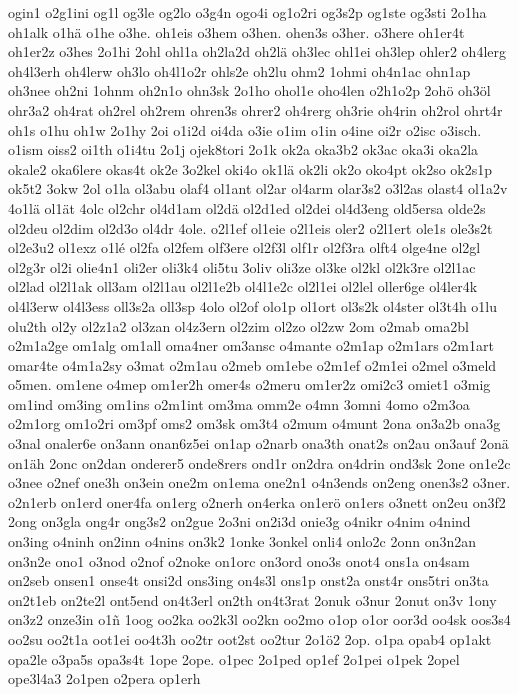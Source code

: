 {ogin1
o2g1ini
og1l
og3le
og2lo
o3g4n
ogo4i
og1o2ri
og3s2p
og1ste
og3sti
2o1ha
oh1alk
o1hä
o1he
o3he.
oh1eis
o3hem
o3hen.
ohen3s
o3her.
o3here
oh1er4t
oh1er2z
o3hes
2o1hi
2ohl
ohl1a
oh2la2d
oh2lä
oh3lec
ohl1ei
oh3lep
ohler2
oh4lerg
oh4l3erh
oh4lerw
oh3lo
oh4l1o2r
ohls2e
oh2lu
ohm2
1ohmi
oh4n1ac
ohn1ap
oh3nee
oh2ni
1ohnm
oh2n1o
ohn3sk
2o1ho
ohol1e
oho4len
o2h1o2p
2ohö
oh3öl
ohr3a2
oh4rat
oh2rel
oh2rem
ohren3s
ohrer2
oh4rerg
oh3rie
oh4rin
oh2rol
ohrt4r
oh1s
o1hu
oh1w
2o1hy
2oi
o1i2d
oi4da
o3ie
o1im
o1in
o4ine
oi2r
o2isc
o3isch.
o1ism
oiss2
oi1th
o1i4tu
2o1j
ojek8tori
2o1k
ok2a
oka3b2
ok3ac
oka3i
oka2la
okale2
oka6lere
okas4t
ok2e
3o2kel
oki4o
ok1lä
ok2li
ok2o
oko4pt
ok2so
ok2s1p
ok5t2
3okw
2ol
o1la
ol3abu
olaf4
ol1ant
ol2ar
ol4arm
olar3s2
o3l2as
olast4
ol1a2v
4o1lä
ol1ät
4olc
ol2chr
ol4d1am
ol2dä
ol2d1ed
ol2dei
ol4d3eng
old5ersa
olde2s
ol2deu
ol2dim
ol2d3o
ol4dr
4ole.
o2l1ef
ol1eie
o2l1eis
oler2
o2l1ert
ole1s
ole3s2t
ol2e3u2
ol1exz
o1lé
ol2fa
ol2fem
olf3ere
ol2f3l
olf1r
ol2f3ra
olft4
olge4ne
ol2gl
ol2g3r
ol2i
olie4n1
oli2er
oli3k4
oli5tu
3oliv
oli3ze
ol3ke
ol2kl
ol2k3re
ol2l1ac
ol2lad
ol2l1ak
oll3am
ol2l1au
ol2l1e2b
ol4l1e2c
ol2l1ei
ol2lel
oller6ge
ol4ler4k
ol4l3erw
ol4l3ess
oll3s2a
oll3sp
4olo
ol2of
olo1p
ol1ort
ol3s2k
ol4ster
ol3t4h
o1lu
olu2th
ol2y
ol2z1a2
ol3zan
ol4z3ern
ol2zim
ol2zo
ol2zw
2om
o2mab
oma2bl
o2m1a2ge
om1alg
om1all
oma4ner
om3ansc
o4mante
o2m1ap
o2m1ars
o2m1art
omar4te
o4m1a2sy
o3mat
o2m1au
o2meb
om1ebe
o2m1ef
o2m1ei
o2mel
o3meld
o5men.
om1ene
o4mep
om1er2h
omer4s
o2meru
om1er2z
omi2c3
omiet1
o3mig
om1ind
om3ing
om1ins
o2m1int
om3ma
omm2e
o4mn
3omni
4omo
o2m3oa
o2m1org
om1o2ri
om3pf
oms2
om3sk
om3t4
o2mum
o4munt
2ona
on3a2b
ona3g
o3nal
onaler6e
on3ann
onan6z5ei
on1ap
o2narb
ona3th
onat2s
on2au
on3auf
2onä
on1äh
2onc
on2dan
onderer5
onde8rers
ond1r
on2dra
on4drin
ond3sk
2one
on1e2c
o3nee
o2nef
one3h
on3ein
one2m
on1ema
one2n1
o4n3ends
on2eng
onen3s2
o3ner.
o2n1erb
on1erd
oner4fa
on1erg
o2nerh
on4erka
on1erö
on1ers
o3nett
on2eu
on3f2
2ong
on3gla
ong4r
ong3s2
on2gue
2o3ni
on2i3d
onie3g
o4nikr
o4nim
o4nind
on3ing
o4ninh
on2inn
o4nins
on3k2
1onke
3onkel
onli4
onlo2c
2onn
on3n2an
on3n2e
ono1
o3nod
o2nof
o2noke
on1orc
on3ord
ono3s
onot4
ons1a
on4sam
on2seb
onsen1
onse4t
onsi2d
ons3ing
on4s3l
ons1p
onst2a
onst4r
ons5tri
on3ta
on2t1eb
on2te2l
ont5end
on4t3erl
on2th
on4t3rat
2onuk
o3nur
2onut
on3v
1ony
on3z2
onze3in
o1ñ
1oog
oo2ka
oo2k3l
oo2kn
oo2mo
o1op
o1or
oor3d
oo4sk
oos3s4
oo2su
oo2t1a
oot1ei
oo4t3h
oo2tr
oot2st
oo2tur
2o1ö2
2op.
o1pa
opab4
op1akt
opa2le
o3pa5s
opa3s4t
1ope
2ope.
o1pec
2o1ped
op1ef
2o1pei
o1pek
2opel
ope3l4a3
2o1pen
o2pera
op1erh
}
